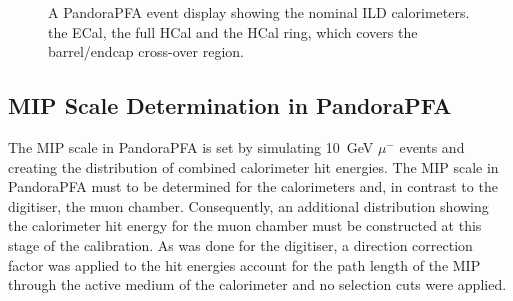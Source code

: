 \begin{figure}[h!]
\caption[A PandoraPFA event display showing the nominal ILD calorimeters.  \protect{} the ECal, \protect{} the full HCal and \protect{} the HCal ring, which covers the barrel/endcap cross-over region.]{A PandoraPFA event display showing the nominal ILD calorimeters.  \protect{} the ECal, \protect{} the full HCal and \protect{} the HCal ring, which covers the barrel/endcap cross-over region.}
\label{fig:calorimeters}
\end{figure}


\subsection{MIP Scale Determination in PandoraPFA}
The MIP scale in PandoraPFA is set by simulating 10~GeV $\mu^{-}$ events and creating the distribution of combined calorimeter hit energies.  The MIP scale in PandoraPFA must to be determined for the calorimeters and, in contrast to the digitiser, the muon chamber.  Consequently, an additional distribution showing the calorimeter hit energy for the muon chamber must be constructed at this stage of the calibration.  As was done for the digitiser, a direction correction factor was applied to the hit energies account for the path length of the MIP through the active medium of the calorimeter and no selection cuts were applied.  

